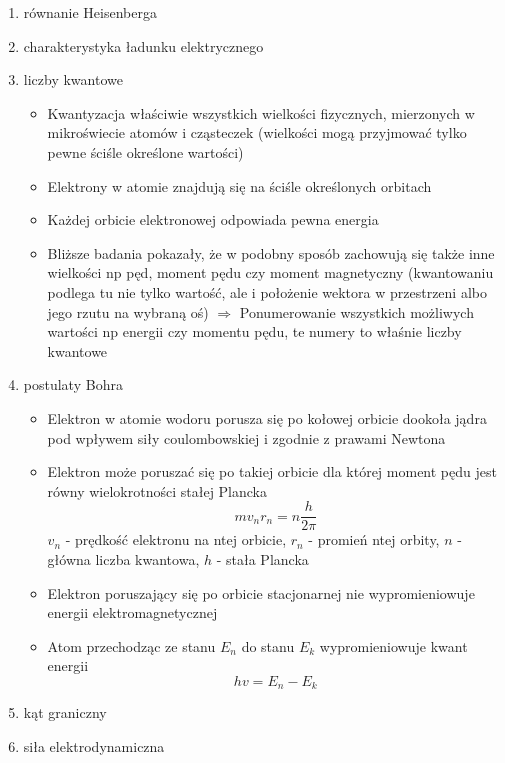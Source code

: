 \documentclass[12pt,a4paper]{article}
\begin{document}
\begin {enumerate}

\item równanie Heisenberga

\item charakterystyka ładunku elektrycznego

\item liczby kwantowe

\begin{itemize}
	\item Kwantyzacja właściwie wszystkich wielkości fizycznych, mierzonych w mikroświecie atomów i cząsteczek (wielkości mogą przyjmować tylko pewne ściśle określone wartości)
	\item Elektrony w atomie znajdują się na ściśle określonych orbitach
	\item Każdej orbicie elektronowej odpowiada pewna energia
	\item Bliższe badania pokazały, że w podobny sposób zachowują się także inne wielkości np pęd, moment pędu czy moment magnetyczny (kwantowaniu podlega tu nie tylko wartość, ale i położenie wektora w przestrzeni albo jego rzutu na wybraną oś) $\Rightarrow$ Ponumerowanie wszystkich możliwych wartości np energii czy momentu pędu, te numery to właśnie liczby kwantowe
\end{itemize}

\item postulaty Bohra

\begin{itemize}
	\item Elektron w atomie wodoru porusza się po kołowej orbicie dookoła jądra pod wpływem siły coulombowskiej i zgodnie z prawami Newtona
	\item Elektron może poruszać się po takiej orbicie dla której moment pędu jest równy wielokrotności stałej Plancka
	$$mv_nr_n=n\frac{h}{2\pi}$$
	$v_n$ - prędkość elektronu na ntej orbicie, $r_n$ - promień ntej orbity, $n$ - główna liczba kwantowa, $h$ - stała Plancka
	\item Elektron poruszający się po orbicie stacjonarnej nie wypromieniowuje energii elektromagnetycznej
	\item Atom przechodząc ze stanu $E_n$ do stanu $E_k$ wypromieniowuje kwant energii
	$$hv = E_n-E_k$$
\end{itemize}

\item kąt graniczny

\item siła elektrodynamiczna


\end{enumerate}
\end{document}
